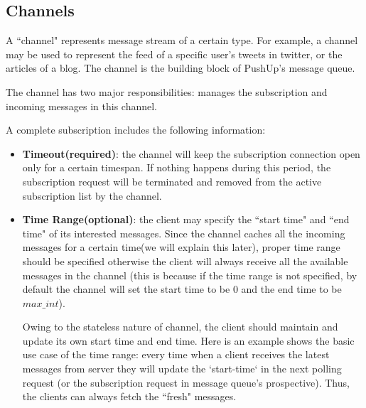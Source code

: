\subsection{Channels\\}

A ``channel" represents message stream of a certain type. For example, a
channel may be used to represent the feed of a specific user's tweets in
twitter, or the articles of a blog. The channel is the building block of 
PushUp's message queue.

The channel has two major responsibilities: manages the subscription and
incoming messages in this channel.

A complete subscription includes the following information:

\begin{itemize}
    \item {\bf Timeout(required)}: the channel will keep the subscription 
        connection open only for a certain timespan. If nothing happens 
        during this period, the
        subscription request will be terminated and removed from the active 
        subscription list by the channel.
    \item {\bf Time Range(optional)}: the client may specify the ``start time"
        and ``end time" of its interested messages. Since the channel 
        caches all the incoming messages for a certain time(we will explain this later), 
        proper time range should be specified otherwise the client will 
        always receive all the available messages in the channel (this is
        because if the time range is not specified, by default the channel
        will set the start time to be $0$ and the end time to be 
        $max\_int$).

        Owing to the stateless nature of channel, the client should 
        maintain and update its own start time and end time. 
        Here is an example shows the basic use case of the time range:
        every time when a client receives the latest messages from server
        they will update the `start-time` in the next polling request (or 
        the subscription request in message queue's prospective). Thus, the
        clients can always fetch the ``fresh" messages.
\end{itemize}

